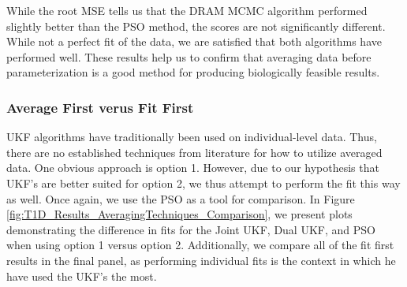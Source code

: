While the root MSE tells us that the DRAM MCMC algorithm performed slightly better than the PSO method, the scores are not significantly different. While not a perfect fit of the data, we are satisfied that both algorithms have performed well. These results help us to confirm that averaging data before parameterization is a good method for producing biologically feasible results.
\subsubsection{Average First verus Fit First}
UKF algorithms have traditionally been used on individual-level data. Thus, there are no established techniques from literature for how to utilize averaged data. One obvious approach is option 1. However, due to our hypothesis that UKF's are better suited for option 2, we thus attempt to perform the fit this way as well. Once again, we use the PSO as a tool for comparison. In Figure \ref{fig:T1D_Results_AveragingTechniques_Comparison}, we present plots demonstrating the difference in fits for the Joint UKF, Dual UKF, and PSO when using option 1 versus option 2. Additionally, we compare all of the fit first results in the final panel, as performing individual fits is the context in which he have used the UKF's the most.


